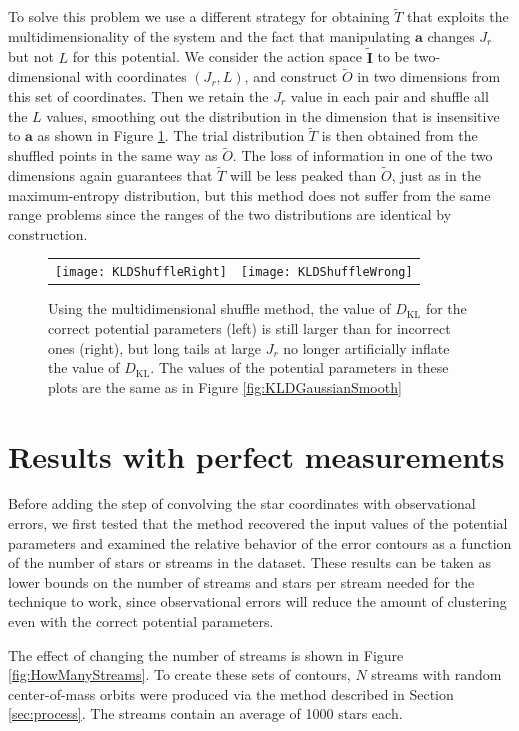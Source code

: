 \documentclass[useAMS,usenatbib,a4paper]{mn2e}
\newcommand{\sub}[2]{\ensuremath{#1_{\mathrm{#2}}}}
\begin{document}
To solve this problem we use a different strategy for obtaining $\tilde{T}$ that exploits the multidimensionality of the system and the fact that manipulating $\mathbf{a}$ changes $J_r$ but not $L$ for this potential. We consider the action space $\tilde{\mathbf{I}}$ to be two-dimensional with coordinates $(J_r, L)$, and construct $\tilde{O}$ in two dimensions from this set of coordinates. Then we retain the $J_r$ value in each pair and shuffle all the $L$ values, smoothing out the distribution in the dimension that is insensitive to $\mathbf{a}$ as shown in Figure \ref{fig:shuffL}. The trial distribution $\tilde{T}$ is then obtained from the shuffled points in the same way as $\tilde{O}$. The loss of information in one of the two dimensions again guarantees that $\tilde{T}$ will be less peaked than $\tilde{O}$, just as in the maximum-entropy distribution, but this method does not suffer from the same range problems since the ranges of the two distributions are identical by construction.

\begin{figure}
 \begin{tabular}{cc}
\texttt{[image: KLDShuffleRight]} & \texttt{[image: KLDShuffleWrong]}
\end{tabular}
\caption{Using the multidimensional shuffle method, the value of $\sub{D}{KL}$ for the correct potential parameters  (left) is still larger than for incorrect ones (right), but long tails at large $J_r$ no longer artificially inflate the value of $\sub{D}{KL}$. The values of the potential parameters in these plots are the same as in Figure \ref{fig:KLDGaussianSmooth}}
\label{fig:shuffL}
\end{figure}

\section{Results with perfect measurements}

Before adding the step of convolving the star coordinates with observational errors, we first tested that the method recovered the input values of the potential parameters and examined the relative behavior of the error contours as a function of the number of stars or streams in the dataset. These results can be taken as lower bounds on the number of streams and stars per stream needed for the technique to work, since observational errors will reduce the amount of clustering even with the correct potential parameters.

The effect of changing the number of streams is shown in Figure \ref{fig:HowManyStreams}. To create these sets of contours, $N$ streams with random center-of-mass orbits were produced via the method described in Section \ref{sec:process}. The streams contain an average of 1000 stars each. 
\end{document}
